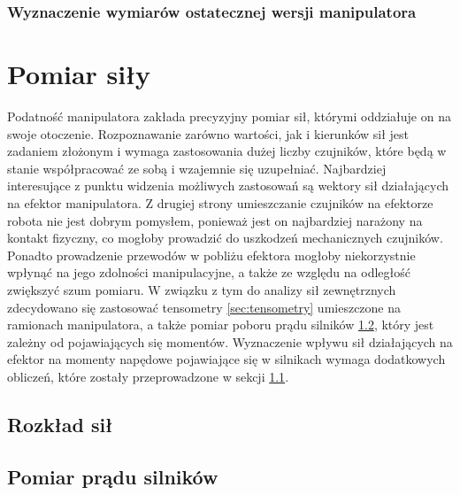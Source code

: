 \documentclass[printmode]{mgr}
\begin{document}
\subsection{Wyznaczenie wymiarów ostatecznej wersji manipulatora}


\chapter{Pomiar siły}
Podatność manipulatora zakłada precyzyjny pomiar sił, którymi oddziałuje on na swoje otoczenie. Rozpoznawanie
zarówno wartości, jak i kierunków sił jest zadaniem złożonym i wymaga zastosowania dużej liczby czujników, które
będą w stanie współpracować ze sobą i wzajemnie się uzupełniać. Najbardziej interesujące z punktu widzenia możliwych zastosowań
są wektory sił działających na efektor manipulatora. Z drugiej strony umieszczanie czujników na efektorze robota nie jest dobrym pomysłem,
ponieważ jest on najbardziej narażony na kontakt fizyczny, co mogłoby prowadzić do uszkodzeń mechanicznych czujników. Ponadto
prowadzenie przewodów w pobliżu efektora mogłoby niekorzystnie wpłynąć na jego zdolności manipulacyjne, a także ze względu na odległość zwiększyć
szum pomiaru. W związku z tym do analizy sił zewnętrznych zdecydowano się zastosować tensometry \ref{sec:tensometry} umieszczone na 
ramionach manipulatora, 
a także pomiar poboru prądu silników \ref{sec:pomiar_pradu_silnikow}, który jest zależny od pojawiających się momentów. Wyznaczenie wpływu sił działających
na efektor na momenty napędowe pojawiające się w silnikach wymaga dodatkowych obliczeń, które zostały przeprowadzone w sekcji \ref{sec:rozklad_sil}.

\section{Rozkład sił}\label{sec:rozklad_sil}

\section{Pomiar prądu silników}\label{sec:pomiar_pradu_silnikow}
\end{document}
